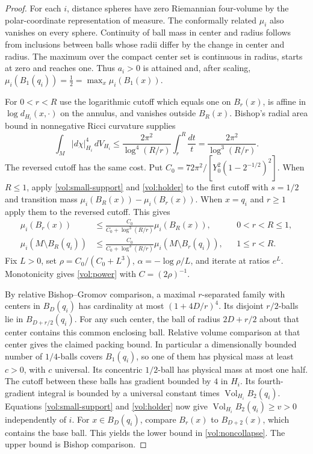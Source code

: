 \begin{proof}
For each \(i\), distance spheres have zero Riemannian
four-volume by the polar-coordinate representation of measure.
The conformally related \(\mu_i\) also vanishes on every sphere.
Continuity of ball mass in center and radius follows from
inclusions between balls whose radii differ by the change in
center and radius. The maximum over the compact center set is
continuous in radius, starts at zero and reaches one. Thus
\(a_i>0\) is attained and, after scaling,
\(\mu_i(B_1(q_i))=\tfrac12=\max_x\mu_i(B_1(x))\).

For \(0<r<R\) use the logarithmic cutoff which equals one on
\(B_r(x)\), is affine in \(\log d_{H_i}(x,\cdot)\) on the annulus,
and vanishes outside \(B_R(x)\). Bishop's radial area bound in
nonnegative Ricci curvature supplies
\[
 \int_M |d\chi|_{H_i}^4\,dV_{H_i}
 \leq \frac{2\pi^2}{\log^4(R/r)}\int_r^R\frac{dt}{t}
 =\frac{2\pi^2}{\log^3(R/r)} .
\]
The reversed cutoff has the same cost. Put
\(C_0=72\pi^2/[Y_0^2(1-2^{-1/2})^2]\). When \(R\leq1\), apply
\eqref{vol:small-support} and \eqref{vol:holder} to the first
cutoff with \(s=1/2\) and transition mass
\(\mu_i(B_R(x))-\mu_i(B_r(x))\). When \(x=q_i\) and \(r\geq1\)
apply them to the reversed cutoff. This gives
\begin{align*}
 \mu_i(B_r(x))&\leq\frac{C_0}{C_0+\log^3(R/r)}\mu_i(B_R(x)),
       &&0<r<R\leq1,\\
 \mu_i(M\setminus B_R(q_i))&\leq
     \frac{C_0}{C_0+\log^3(R/r)}\mu_i(M\setminus B_r(q_i)),
       &&1\leq r<R .
\end{align*}
Fix \(L>0\), set \(\rho=C_0/(C_0+L^3)\),
\(\alpha=-\log\rho/L\), and iterate at ratios \(e^L\).
Monotonicity gives \eqref{vol:power} with \(C=(2\rho)^{-1}\).

By relative Bishop--Gromov comparison, a maximal \(r\)-separated
family with centers in \(B_D(q_i)\) has cardinality at most
\((1+4D/r)^4\). Its disjoint \(r/2\)-balls lie in
\(B_{D+r/2}(q_i)\). For any such center, the ball of radius
\(2D+r/2\) about that center contains this common enclosing ball.
Relative volume comparison at that center gives the claimed
packing bound. In particular a dimensionally bounded number of
\(1/4\)-balls covers \(B_1(q_i)\), so one of them has physical
mass at least \(c>0\), with \(c\) universal. Its concentric
\(1/2\)-ball has physical mass at most one half. The cutoff between
these balls has gradient bounded by \(4\) in \(H_i\).
Its fourth-gradient integral is bounded by a universal constant
times \(\operatorname{Vol}_{H_i}B_2(q_i)\).
Equations \eqref{vol:small-support} and \eqref{vol:holder} now give
\(\operatorname{Vol}_{H_i}B_2(q_i)\geq v>0\) independently of \(i\).
For \(x\in B_D(q_i)\), compare \(B_r(x)\) to \(B_{D+2}(x)\),
which contains the base ball. This yields the lower bound in
\eqref{vol:noncollapse}. The upper bound is Bishop comparison.
\end{proof}

